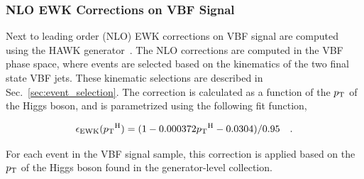 \clearpage

\subsubsection{NLO EWK Corrections on VBF Signal}
\label{subsubsec:vbf_nlo_ewk}

Next to leading order (NLO) EWK corrections on VBF signal are computed using the HAWK generator~\cite{HAWKGenerator}. 
The NLO corrections are computed in the VBF phase space, where events are selected based on the kinematics of the two final state VBF jets.
These kinematic selections are described in Sec.~\ref{sec:event_selection}.
The correction is calculated as a function of the $p_{\textrm{T}}$ of the Higgs boson, and is parametrized using the following fit function,

\begin{equation}
    \epsilon_{\textrm{EWK}}({p_{\textrm{T}}}^{\textrm{H}}) = (1 - 0.000372 {p_{\textrm{T}}}^{\textrm{H}} - 0.0304) / 0.95 \quad .
\end{equation}

For each event in the VBF signal sample, this correction is applied based on the $p_{\textrm{T}}$ of the Higgs boson found in the generator-level collection.